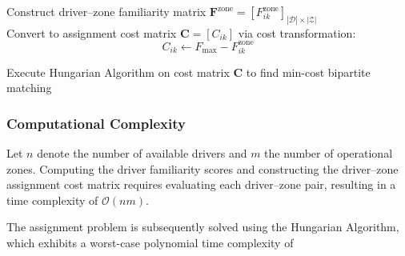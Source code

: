 \documentclass{article}
\begin{document}
\begin{algorithm}[htbp]


\BlankLine
{}

\BlankLine
{}

\BlankLine
Construct driver--zone familiarity matrix $\mathbf{F}^{\mathrm{zone}} = [F_{ik}^{\mathrm{zone}}]_{|\mathcal{D}| \times |\mathcal{Z}|}$\;\\
Convert to assignment cost matrix $\mathbf{C} = [C_{ik}]$ via cost transformation:
\[
C_{ik} \leftarrow F_{\max} - F_{ik}^{\mathrm{zone}}
\]

\BlankLine
Execute Hungarian Algorithm on cost matrix $\mathbf{C}$ to find min-cost bipartite matching\;\\
\;
\caption{Driver--Zone Assignment Algorithm}
\label{alg:zone_assignment}
\end{algorithm}

\subsubsection{Computational Complexity}
Let $n$ denote the number of available drivers and $m$ the number of operational zones. Computing the driver familiarity scores and constructing the driver--zone assignment cost matrix requires evaluating each driver--zone pair, resulting in a time complexity of $\mathcal{O}(nm)$. 

The assignment problem is subsequently solved using the Hungarian Algorithm, which exhibits a worst-case polynomial time complexity of
\end{document}
